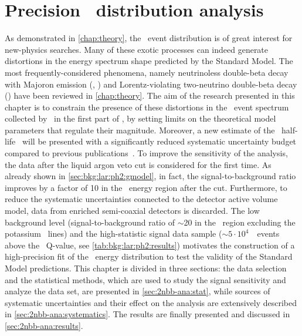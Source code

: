 
\chapter{\texorpdfstring{Precision \nnbb\ distribution analysis}{Precision 2νββ distribution analysis}}%
\label{chap:2nbb-ana}

As demonstrated in \cref{chap:theory}, the \nnbb\ event distribution is of
great interest for new-physics searches. Many of these exotic processes can indeed
generate distortions in the energy spectrum shape predicted by the Standard Model. The
most frequently-considered phenomena, namely neutrinoless double-beta decay with Majoron
emission (\onbbx, \onbbxx) and Lorentz-violating two-neutrino double-beta decay (\nnbblv)
have been reviewed in \cref{chap:theory}. The aim of the research presented in this
chapter is to constrain the presence of these distortions in the \nnbb\ event spectrum collected
by \gerda\ in the first part of \phasetwo, by setting limits on the theoretical model
parameters that regulate their magnitude. Moreover, a new estimate of the \nnbb\ half-life
\thalftwo\ will be presented with a significantly reduced systematic uncertainty budget
compared to previous publications~\cite{Agostini2015a}. To improve the sensitivity of the
analysis, the data after the liquid argon veto cut is considered for the first time. As
already shown in \cref{sec:bkg:lar:ph2:gmodel}, in fact, the signal-to-background ratio
improves by a factor of 10 in the \nnbb\ energy region after the cut. Furthermore, to
reduce the systematic uncertainties connected to the detector active volume model, data
from enriched semi-coaxial detectors is discarded. The low background level
(signal-to-background ratio of $\sim$20 in the \nnbb\ region excluding the potassium \g\
lines) and the high-statistic signal data sample ($\sim$$5 \cdot 10^{4}$~\nnbb\ events
above the \Arl\ Q-value, see \cref{tab:bkg:lar:ph2:results}) motivates the construction of
a high-precision fit of the \nnbb\ energy distribution to test the validity of the
Standard Model predictions.
\newpar
This chapter is divided in three sections: the data selection and the statistical methods,
which are used to study the signal sensitivity and analyze the data set, are presented in
\cref{sec:2nbb-ana:stat}, while sources of systematic uncertainties and their effect on
the analysis are extensively described in \cref{sec:2nbb-ana:systematics}. The
results are finally presented and discussed in \cref{sec:2nbb-ana:results}.

